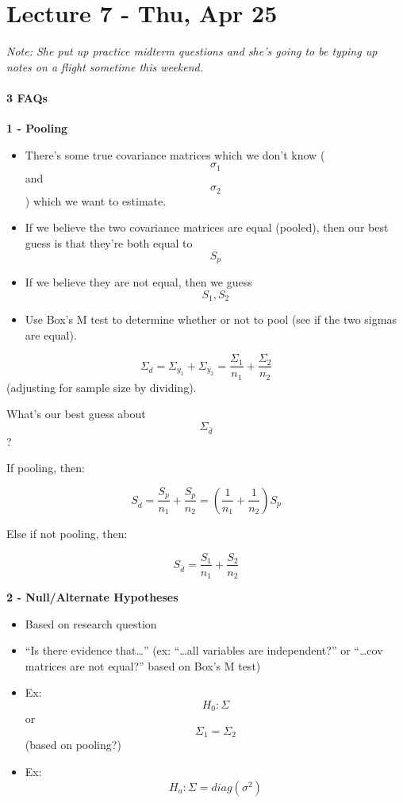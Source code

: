 \hypertarget{lecture-7---thu-apr-25}{%
\chapter{Lecture 7 - Thu, Apr 25}\label{lecture-7---thu-apr-25}}

\emph{Note: She put up practice midterm questions and she's going to be
typing up notes on a flight sometime this weekend.}

\hypertarget{faqs}{%
\subsubsection{3 FAQs}\label{faqs}}

\textbf{1 - Pooling}

\begin{itemize}
\tightlist
\item
  There's some true covariance matrices which we don't know
  (\[\sigma_1\] and \[\sigma_2\]) which we want to estimate.
\item
  If we believe the two covariance matrices are equal (pooled), then our
  best guess is that they're both equal to \[S_p\]
\item
  If we believe they are not equal, then we guess \[S_1, S_2\]
\item
  Use Box's M test to determine whether or not to pool (see if the two
  sigmas are equal).
\end{itemize}

\[\Sigma_{\bar{d}} = \Sigma_{\bar{y_1}} + \Sigma_{\bar{y_2}} = \frac{\Sigma_1}{n_1} + \frac{\Sigma_2}{n_2}\]
(adjusting for sample size by dividing).

What's our best guess about \[ \Sigma_{\bar{d}} \] ?

If pooling, then:

\[S_{\bar{d}} = \frac{S_p}{n_1} + \frac{S_p}{n_2} = (\frac{1}{n_1} + \frac{1}{n_2})S_p\]

Else if not pooling, then:

\[S_{\bar{d}} = \frac{S_1}{n_1} + \frac{S_2}{n_2}\]

\textbf{2 - Null/Alternate Hypotheses}

\begin{itemize}
\tightlist
\item
  Based on research question
\item
  ``Is there evidence that\ldots{}'' (ex: ``\ldots{}all variables are
  independent?'' or ``\ldots{}cov matrices are not equal?'' based on
  Box's M test)
\item
  Ex: \[ H_0: \Sigma \] or \[ \Sigma_1 = \Sigma_2 \] (based on pooling?)
\item
  Ex: \[ H_a: \Sigma = diag(\sigma^2) \]
\end{itemize}

